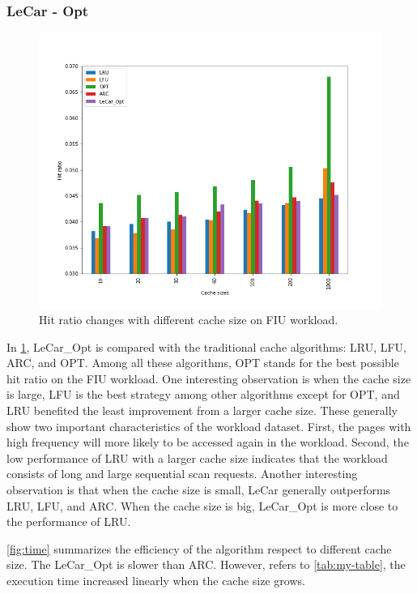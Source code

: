 \documentclass[letterpaper,twocolumn,10pt]{article}
\begin{document}
\subsubsection{LeCar - Opt}
\begin{figure}[!ht]
	\centering 
	\includegraphics[width=0.38\textheight]{hitratio_bar.png}
	\caption{Hit ratio changes with different cache size on FIU workload.
}
	\label{fig:lecar_res}
\end{figure}
In \ref{fig:lecar_res}, LeCar\_Opt is compared with the traditional cache algorithms: LRU, LFU, ARC, and OPT. Among all these algorithms, OPT stands for the best possible hit ratio on the FIU workload. One interesting observation is when the cache size is large, LFU is the best strategy among other algorithms except for OPT, and LRU benefited the least improvement from a larger cache size. These generally show two important characteristics of the workload dataset. First, the pages with high frequency will more likely to be accessed again in the workload. Second, the low performance of LRU with a larger cache size indicates that the workload consists of long and large sequential scan requests. Another interesting observation is that when the cache size is small, LeCar generally outperforms LRU, LFU, and ARC. When the cache size is big, LeCar\_Opt is more close to the performance of LRU. 

\ref{fig:time} summarizes the efficiency of the algorithm respect to different cache size. The LeCar\_Opt is slower than ARC. However, refers to \ref{tab:my-table}, the execution time increased linearly when the cache size grows.
\end{document}
